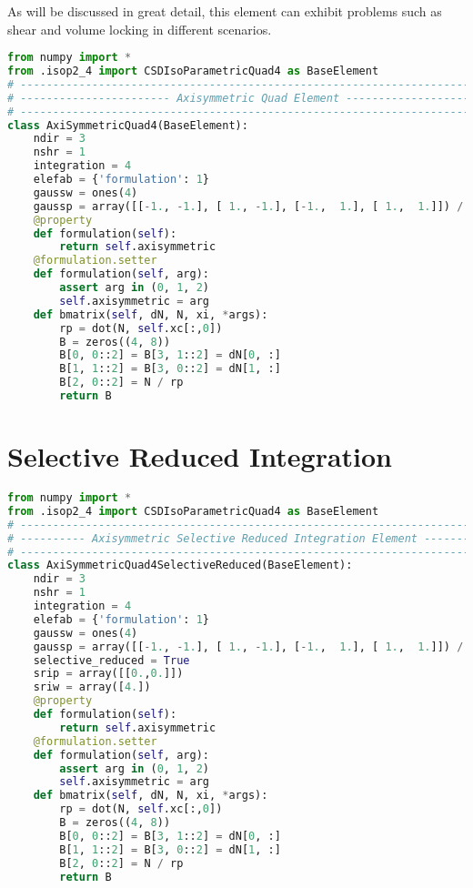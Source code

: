 \documentclass[10pt,letterpaper]{report}
\numberwithin{equation}{chapter}
\begin{document}
As will be discussed in great detail, this element can exhibit problems such as shear and volume locking in different scenarios.
\begin{lstlisting}[language=python]
from numpy import *
from .isop2_4 import CSDIsoParametricQuad4 as BaseElement
# --------------------------------------------------------------------------- #
# ----------------------- Axisymmetric Quad Element ------------------------- #
# --------------------------------------------------------------------------- #
class AxiSymmetricQuad4(BaseElement):
    ndir = 3
    nshr = 1
    integration = 4
    elefab = {'formulation': 1}
    gaussw = ones(4)
    gaussp = array([[-1., -1.], [ 1., -1.], [-1.,  1.], [ 1.,  1.]]) / sqrt(3.)
    @property
    def formulation(self):
        return self.axisymmetric
    @formulation.setter
    def formulation(self, arg):
        assert arg in (0, 1, 2)
        self.axisymmetric = arg
    def bmatrix(self, dN, N, xi, *args):
        rp = dot(N, self.xc[:,0])
        B = zeros((4, 8))
        B[0, 0::2] = B[3, 1::2] = dN[0, :]
        B[1, 1::2] = B[3, 0::2] = dN[1, :]
        B[2, 0::2] = N / rp
        return B

\end{lstlisting}


\section{Selective Reduced Integration}


\begin{lstlisting}[language=Python]
from numpy import *
from .isop2_4 import CSDIsoParametricQuad4 as BaseElement
# --------------------------------------------------------------------------- #
# ---------- Axisymmetric Selective Reduced Integration Element ------------- #
# --------------------------------------------------------------------------- #
class AxiSymmetricQuad4SelectiveReduced(BaseElement):
    ndir = 3
    nshr = 1
    integration = 4
    elefab = {'formulation': 1}
    gaussw = ones(4)
    gaussp = array([[-1., -1.], [ 1., -1.], [-1.,  1.], [ 1.,  1.]]) / sqrt(3.)
    selective_reduced = True
    srip = array([[0.,0.]])
    sriw = array([4.])
    @property
    def formulation(self):
        return self.axisymmetric
    @formulation.setter
    def formulation(self, arg):
        assert arg in (0, 1, 2)
        self.axisymmetric = arg
    def bmatrix(self, dN, N, xi, *args):
        rp = dot(N, self.xc[:,0])
        B = zeros((4, 8))
        B[0, 0::2] = B[3, 1::2] = dN[0, :]
        B[1, 1::2] = B[3, 0::2] = dN[1, :]
        B[2, 0::2] = N / rp
        return B
\end{lstlisting}
\end{document}
